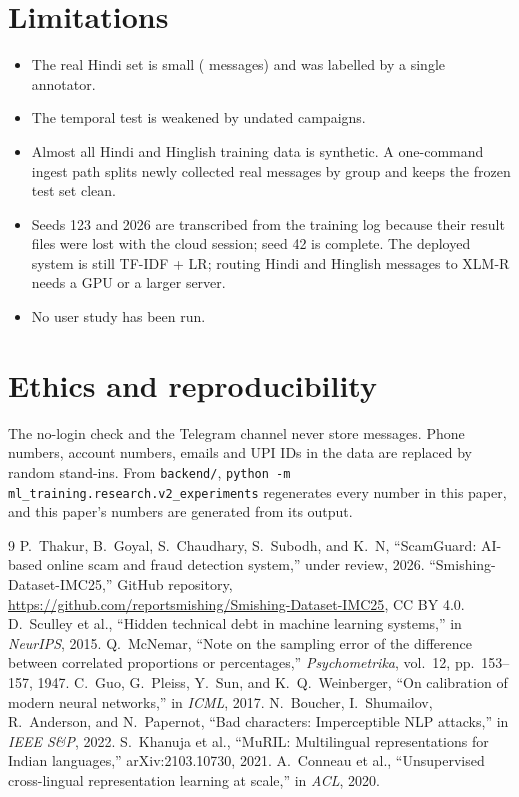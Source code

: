 \documentclass[10pt,twocolumn]{article}
\begin{document}
\section{Limitations}
\begin{itemize}\itemsep0pt
\item The real Hindi set is small (\nRH{} messages) and was labelled by a single annotator.
\item The temporal test is weakened by undated campaigns.
\item Almost all Hindi and Hinglish training data is synthetic. A one-command ingest path splits newly collected real
  messages by group and keeps the frozen test set clean.
\item Seeds 123 and 2026 are transcribed from the training log because their result files were lost with the cloud
  session; seed 42 is complete. The deployed system is still TF-IDF + LR; routing Hindi and
  Hinglish messages to XLM-R needs a GPU or a larger server.
\item No user study has been run.
\end{itemize}

\section{Ethics and reproducibility}
The no-login check and the Telegram channel never store messages. Phone numbers, account numbers, emails and UPI IDs
in the data are replaced by random stand-ins. From \texttt{backend/}, \texttt{python -m
ml\_training.research.v2\_experiments} regenerates every number in this paper, and this paper's numbers are
generated from its output.

\begin{thebibliography}{9}\small
{} P.~Thakur, B.~Goyal, S.~Chaudhary, S.~Subodh, and K.~N, ``ScamGuard: AI-based online scam and fraud detection system,'' under review, 2026.
 ``Smishing-Dataset-IMC25,'' GitHub repository, \url{https://github.com/reportsmishing/Smishing-Dataset-IMC25}, CC BY 4.0.
 D.~Sculley et al., ``Hidden technical debt in machine learning systems,'' in \emph{NeurIPS}, 2015.
 Q.~McNemar, ``Note on the sampling error of the difference between correlated proportions or percentages,'' \emph{Psychometrika}, vol.~12, pp.~153--157, 1947.
 C.~Guo, G.~Pleiss, Y.~Sun, and K.~Q.~Weinberger, ``On calibration of modern neural networks,'' in \emph{ICML}, 2017.
 N.~Boucher, I.~Shumailov, R.~Anderson, and N.~Papernot, ``Bad characters: Imperceptible NLP attacks,'' in \emph{IEEE S\&P}, 2022.
 S.~Khanuja et al., ``MuRIL: Multilingual representations for Indian languages,'' arXiv:2103.10730, 2021.
 A.~Conneau et al., ``Unsupervised cross-lingual representation learning at scale,'' in \emph{ACL}, 2020.
\end{thebibliography}
\end{document}
